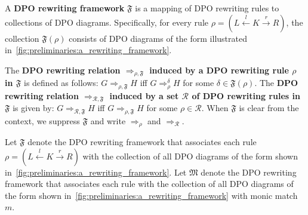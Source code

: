     \begin{definition}
  \label{def:rewriting_framework} 
    A \textbf{DPO rewriting framework} $\mathfrak{F}$ is a mapping of DPO rewriting rules to collections of DPO diagrams. Specifically, for every rule \( \rho = (L \overset{l}{\leftarrow} K \overset{r}{\rightarrow} R) \), the collection $\mathfrak{F}(\rho)$ consists of DPO diagrams of the form illustrated in~\autoref{fig:preliminaries:a_rewriting_framework}.
 \begin{figure}[!ht]
      \centering
        \caption{}
        \label{fig:preliminaries:a_rewriting_framework}
\end{figure}
    The \textbf{DPO rewriting relation $\Rightarrow_{\rho,\mathfrak{F}}$ induced by a DPO rewriting rule $\rho$ in $\mathfrak{F}$} is defined as follows: $G \Rightarrow_{\rho,\mathfrak{F}} H$ iff $G \Rightarrow_\rho^\delta H$ for some $\delta \in \mathfrak{F}(\rho)$. 
     The \textbf{DPO rewriting relation $\Rightarrow_{\mathcal{R},\mathfrak{F}}$ induced by a set $\mathcal{R}$ of DPO rewriting rules in $\mathfrak{F}$} is given by: $G \Rightarrow_{\mathcal{R},\mathfrak{F}} H$ iff $G \Rightarrow_{\rho,\mathfrak{F}} H$ for some $\rho \in \mathcal{R}$. When $\mathfrak{F}$ is clear from the context, we 
    suppress $\mathfrak{F}$ and 
    write $\Rightarrow_{\rho}$ and $\Rightarrow_{\mathcal{R}}$.
  \end{definition}
Let \(\mathfrak{F}\) denote the DPO rewriting framework that associates each rule \( \rho = (L \overset{l}{\leftarrow} K \overset{r}{\rightarrow} R) \) with the collection of all DPO diagrams of the form shown in~\autoref{fig:preliminaries:a_rewriting_framework}.
Let \(\mathfrak{M}\) denote the DPO rewriting framework that associates each rule with the collection of all DPO diagrams of the form shown in~\autoref{fig:preliminaries:a_rewriting_framework} with monic match $m$.  
